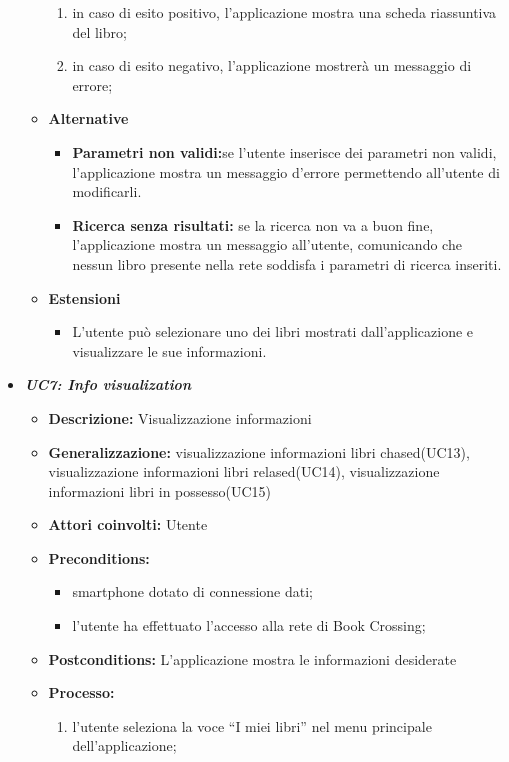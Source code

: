 \begin{itemize}
\begin{itemize}
\begin{enumerate}
			\item in caso di esito positivo, l’applicazione mostra una scheda riassuntiva del libro;
			\item in caso di esito negativo, l’applicazione mostrerà un messaggio di errore;
		\end{enumerate}
		\item \textbf{Alternative}
		\begin{itemize}
			\item \textbf{Parametri non validi:}se l'utente inserisce dei parametri non validi, l'applicazione mostra un messaggio d'errore permettendo all'utente di modificarli.
			\item \textbf{Ricerca senza risultati:} se la ricerca non va a buon fine, l'applicazione mostra un messaggio all'utente, comunicando che nessun libro presente nella rete soddisfa i parametri di ricerca inseriti.
		\end{itemize}
		\item \textbf{Estensioni}
		\begin{itemize}
			\item L'utente può selezionare uno dei libri mostrati dall'applicazione e visualizzare le sue informazioni.
		\end{itemize}
	\end{itemize}
	\item \textbf{\textit{UC7: Info visualization}}
	\begin{itemize}
		\item \textbf{Descrizione: } Visualizzazione informazioni
		\item \textbf{Generalizzazione:} visualizzazione informazioni libri chased(UC13), visualizzazione informazioni libri relased(UC14), visualizzazione informazioni libri in possesso(UC15)
		\item \textbf{Attori coinvolti:} Utente
		\item \textbf{Preconditions:}
		\begin{itemize}
			\item smartphone dotato di connessione dati;
			\item l’utente ha effettuato l’accesso alla rete di Book Crossing;
		\end{itemize}
		\item \textbf{Postconditions:} L’applicazione mostra le informazioni desiderate
		\item \textbf{Processo:}
		\begin{enumerate}
			\item l’utente seleziona la voce “I miei libri” nel menu principale dell’applicazione;

\end{enumerate}
\end{itemize}
\end{itemize}
